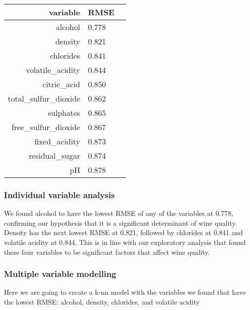 \documentclass[11pt]{article}
\begin{document}
    \begin{tabular}{r|ll}
 variable & RMSE\\
\hline
	 alcohol              & 0.778               \\
	 density              & 0.821               \\
	 chlorides            & 0.841               \\
	 volatile\_acidity     & 0.844                 \\
	 citric\_acid          & 0.850                 \\
	 total\_sulfur\_dioxide & 0.862                   \\
	 sulphates            & 0.865               \\
	 free\_sulfur\_dioxide  & 0.867                   \\
	 fixed\_acidity        & 0.873                 \\
	 residual\_sugar       & 0.874                 \\
	 pH                   & 0.878               \\
\end{tabular}


    
    \hypertarget{individual-variable-analysis}{%
\subsubsection{Individual variable
analysis}\label{individual-variable-analysis}}

We found alcohol to have the lowest RMSE of any of the variables at
0.778, confirming our hypothesis that it is a significant determinant of
wine quality. Density has the next lowest RMSE at 0.821, followed by
chlorides at 0.841 and volatile acidity at 0.844. This is in line with
our exploratory analysis that found these four variables to be
significant factors that affect wine quality.

    \hypertarget{multiple-variable-modelling}{%
\subsubsection{Multiple variable
modelling}\label{multiple-variable-modelling}}

Here we are going to create a k-nn model with the variables we found
that have the lowest RMSE: alcohol, density, chlorides, and volatile
acidity
\end{document}
